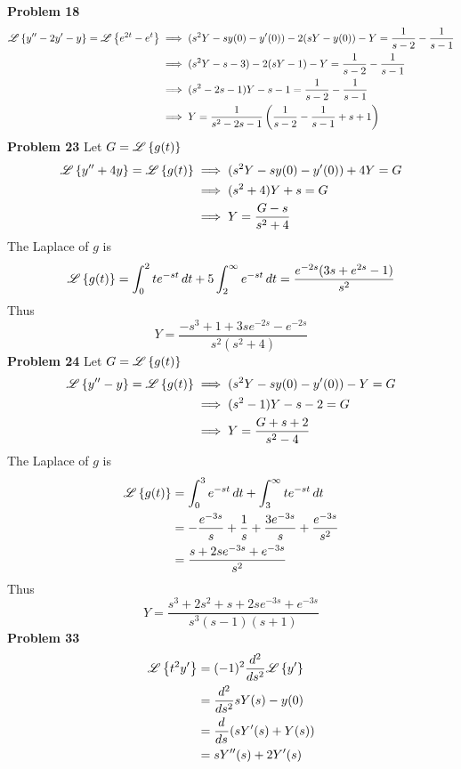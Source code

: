 \textbf{Problem 18}
\begin{align*}
    \lap{y''-2y' - y} = \lap{e^{2t}-e^t}
    &\implies (s^2Y - sy(0) - y'(0)) -2 (sY - y(0)) - Y = \frac{1}{s-2} - \frac{1}{s-1} \\
    &\implies (s^2Y - s - 3) -2 (sY - 1) - Y = \frac{1}{s-2} - \frac{1}{s-1} \\
    &\implies (s^2-2s - 1)Y -s - 1 = \frac{1}{s-2} - \frac{1}{s-1} \\
    &\implies Y = \frac{1}{s^2-2s-1}\left(\frac{1}{s-2} - \frac{1}{s-1} + s + 1\right)\\
\end{align*}
\textbf{Problem 23}
Let $G = \lap{g(t)}$
\begin{align*}
    \lap{y'' + 4y} = \lap{g(t)}
    &\implies (s^2Y - sy(0) - y'(0)) + 4Y  = G \\
    &\implies (s^2+4)Y + s = G \\
    &\implies Y = \frac{G-s}{s^2+4} 
\end{align*}
The Laplace of $g$ is 
\[
    \lap{g(t)} 
    = \int_0^2 te^{-st} \,dt + 5\int_2^\infty e^{-st} \,dt \\
    = \frac{e^{-2s}(3s+e^{2s}-1)}{s^2}
\]
Thus
\[
    Y = \frac{-s^3+1+3se^{-2s}-e^{-2s}}{s^2(s^2+4)}
\]
\textbf{Problem 24}
Let $G = \lap{g(t)}$
\begin{align*}
    \lap{y'' - y} = \lap{g(t)}
    &\implies (s^2Y - sy(0) - y'(0)) - Y  = G \\
    &\implies (s^2-1)Y - s - 2= G \\
    &\implies Y = \frac{G+s+2}{s^2-4} 
\end{align*}
The Laplace of $g$ is 
\begin{align*}
    \lap{g(t)} 
    &= \int_0^3 e^{-st} \,dt + \int_3^\infty te^{-st} \,dt \\
    &= -\frac{e^{-3s}}{s} + \frac{1}{s} + \frac{3e^{-3s}}{s} + \frac{e^{-3s}}{s^2} \\
    &= \frac{s+2se^{-3s}+e^{-3s}}{s^2}
\end{align*}
Thus 
\[
    Y = \frac{s^3+2s^2+s+2se^{-3s}+e^{-3s}}{s^3(s-1)(s+1)}
\]
\textbf{Problem 33}
\begin{align*}
    \lap{t^2y'}
    &= (-1)^2 \der[2]{}{s} \lap{y'} \\
    &= \der[2]{}{s} sY(s) - y(0) \\
    &= \der{}{s} (sY'(s) + Y(s)) \\
    &= sY''(s) + 2Y'(s)
\end{align*}